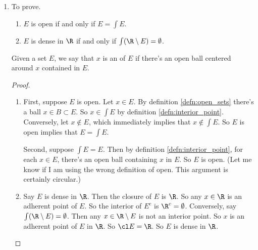 \documentclass[onesided]{ccg-pset}
\begin{document}
\begin{enumerate}
    \item To prove.
        \begin{enumerate}
            \item   $E$ is open if and only if $E = \int E$.
            \item $E$ is dense in $\R$ if and only if $\int(\R \setminus E) = \emptyset$.
        \end{enumerate}

        \begin{defn}
            \label{defn:interior_point}
            Given a set $E$, we say that $x$ is an  of $E$ if there's an open ball centered around $x$ contained in $E$.
        \end{defn}
        \begin{proof}
        \begin{enumerate}
            \item First, suppose $E$ is open. Let $x \in E$. By definition \ref{defn:open_sets} there's a ball $x \in B \subset E$. So $x \in \int E$ by definition \ref{defn:interior_point}. Conversely, let $x \notin E$, which immediately implies that $x \notin \int E$. So $E$ is open implies that $E = \int E$.

                Second, suppose $\int E = E$. Then by definition \ref{defn:interior_point}, for each $x \in E$, there's an open ball containing $x$ in $E$.  So $E$ is open. (Let me know if I am using the wrong definition of open. This argument is certainly circular.)

            \item Say $E$ is dense in $\R$. Then the closure of $E$ is $\R$. So any $x \in \R$ is an adherent point of $E$. So the interior of $E^c$ is $\R^c = \emptyset$. Conversely, say $\int(\R \setminus E) = \emptyset$. Then any $x \in \R \setminus E$ is not an interior point. So $x$ is an adherent point of $E$ in $\R$. So $\cl E = \R$. So $E$ is dense in $\R$.
        \end{enumerate}
        \end{proof}
\end{enumerate}
\end{document}
